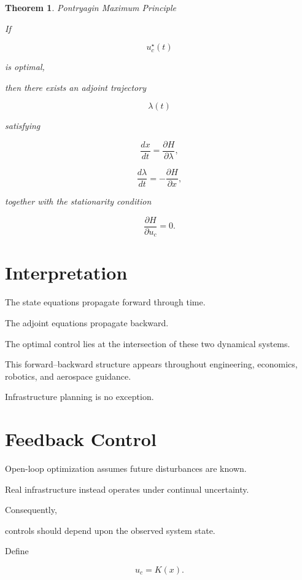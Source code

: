 \documentclass[11pt,fleqn]{book}
\numberwithin{equation}{chapter}
\theoremstyle{plain}
\newtheorem{theorem}{Theorem}[chapter]
\theoremstyle{definition}
\theoremstyle{remark}
\begin{document}
\begin{theorem}{Pontryagin Maximum Principle}

If

\[
u_c^\star(t)
\]

is optimal,

then there exists an adjoint trajectory

\[
\lambda(t)
\]

satisfying

\[
\boxed{
\frac{dx}{dt}
=
\frac{\partial H}{\partial\lambda},
}
\]

\[
\boxed{
\frac{d\lambda}{dt}
=
-
\frac{\partial H}{\partial x},
}
\]

together with the stationarity condition

\[
\boxed{
\frac{\partial H}{\partial u_c}
=
0.
}
\]

\end{theorem}


\section{Interpretation}

The state equations propagate forward through time.

The adjoint equations propagate backward.

The optimal control lies at the intersection of these two dynamical
systems.

This forward--backward structure appears throughout engineering,
economics, robotics, and aerospace guidance.

Infrastructure planning is no exception.


\section{Feedback Control}

Open-loop optimization assumes future disturbances are known.

Real infrastructure instead operates under continual uncertainty.

Consequently,

controls should depend upon the observed system state.

Define

\[
u_c
=
K(x).
\]
\end{document}
